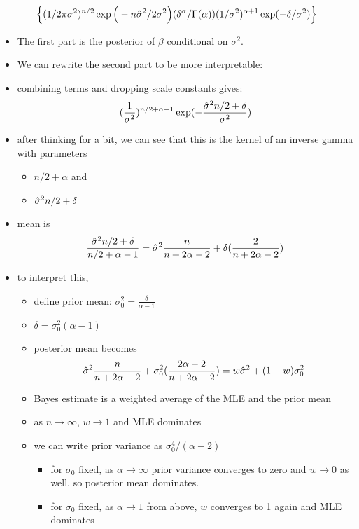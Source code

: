 \begin{itemize}
\begin{multline*}
    \Big\{(1/2\pi\sigma^2)^{n/2} 
           \exp\Big(- n\hat{\sigma}^2/2\sigma^2 \Big) 
           (\delta^\alpha/\Gamma(\alpha)) (1/\sigma^2)^{\alpha+1} \exp(-\delta/\sigma^2) \Big\}
  \end{multline*}
\begin{itemize}
\item The first part is the posterior of $\beta$ conditional on $\sigma^2$.
\item We can rewrite the second part to be more interpretable:
\item combining terms and dropping scale constants gives:
  \[(\frac{1}{\sigma^2})^{n/2 + \alpha + 1} \exp(- \frac{\hat{\sigma}^2 n/2 + \delta}{\sigma^2})\]
\item after thinking for a bit, we can see that this is the kernel of an inverse
         gamma with parameters
\begin{itemize}
\item $n/2+\alpha$ and
\item $\hat{\sigma}^2 n/2 + \delta$
\end{itemize}
\item mean is
  \[\frac{\hat{\sigma}^2 n/2 + \delta}{n/2 + \alpha - 1}
  = \hat{\sigma}^2 \frac{n}{n + 2\alpha - 2} + \delta(\frac{2}{n + 2\alpha - 2})\]
\item to interpret this,
\begin{itemize}
\item define prior mean: $\sigma_0^2 = \frac{\delta}{\alpha - 1}$
\item $\delta = \sigma^2_0 (\alpha - 1)$
\item posterior mean becomes 
  \[\hat{\sigma}^2 \frac{n}{n + 2\alpha - 2} + \sigma_0^2(\frac{2 \alpha - 2}{n + 2\alpha - 2}) 
  = w \hat{\sigma}^2 + (1-w) \sigma_0^2\]
\item Bayes estimate is a weighted average of the MLE and the
           prior mean
\item as $n \to \infty$, $w \to 1$ and MLE dominates
\item we can write prior variance as $\sigma_0^4 / (\alpha - 2)$
\begin{itemize}
\item for $\sigma_0$ fixed, as $\alpha \to \infty$ prior
             variance converges to zero and $w \to 0$ as well, so
             posterior mean dominates.
\item for $\sigma_0$ fixed, as $\alpha \to 1$ from above, $w$
             converges to 1 again and MLE dominates
\end{itemize}
\end{itemize}
\end{itemize}
\end{itemize}

